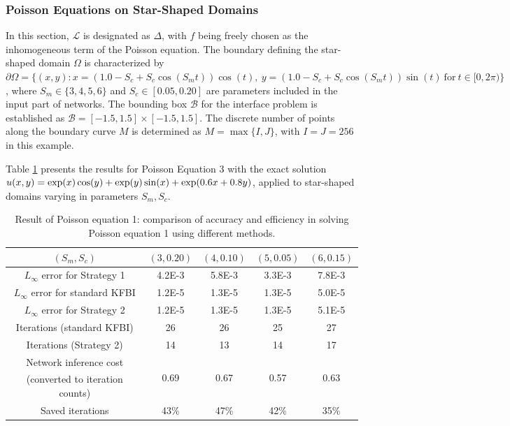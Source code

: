 \documentclass{article}
\begin{document}
\subsubsection{Poisson Equations on Star-Shaped Domains} \label{Poisson Equations on Star-Shaped Domains}
In this section, $\mathcal{L}$ is designated as $\Delta$, with $f$ being freely chosen as the inhomogeneous term of the Poisson equation. The boundary defining the star-shaped domain $\Omega$ is characterized by $\partial \Omega = \{(x, y): x = (1.0 - S_c + S_c \cos(S_m t)) \cos(t),\ y = (1.0 - S_c + S_c \cos(S_m t)) \sin(t)\ \mbox{for}\ t \in [0, 2\pi) \}$, where $S_m \in \{3, 4, 5, 6\}$ and $S_c \in [0.05, 0.20]$ are parameters included in the input part of networks. The bounding box $\mathcal{B}$ for the interface problem is established as $\mathcal{B} = [-1.5,1.5] \times [-1.5,1.5]$. The discrete number of points along the boundary curve $M$ is determined as $M = \max\{I, J\}$, with $I = J = 256$ in this example.

Table \ref{label2_4} presents the results for Poisson Equation 3 with the exact solution $u(x, y) = \exp(x) \\ \cos(y) + \exp(y) \sin(x) + \exp(0.6 x + 0.8 y)$, applied to star-shaped domains varying in parameters $S_m, S_c$.

\begin{table}[ht]
    \centering
    \begin{tabular}{|c|c|c|c|c|} \hline 
         $(S_m, S_c) $ & $(3, 0.20)$& $(4, 0.10) $& $(5, 0.05)$& $(6, 0.15) $\\ \hline 
         $L_{\infty}$ error for Strategy 1 & 4.2E-3 & 5.8E-3 & 3.3E-3 & 7.8E-3 \\ \hline
         $L_{\infty}$ error for standard KFBI & 1.2E-5 & 1.3E-5 & 1.3E-5 & 5.0E-5 \\ \hline
         $L_{\infty}$ error for Strategy 2 & 1.2E-5 & 1.3E-5 & 1.3E-5 & 5.1E-5 \\ \hline
         Iterations (standard KFBI) &  26&  26&25& 27\\ \hline 
         Iterations (Strategy 2) & 14&  13&14&17\\  \hline 
         
         Network inference cost
         & \multirow{2}{*}{0.69\bigstrut}
         & \multirow{2}{*}{0.67\bigstrut}
         & \multirow{2}{*}{0.57\bigstrut}
         & \multirow{2}{*}{0.63\bigstrut} \\
         (converted to iteration counts) & & & & \\ \hline
          
         Saved iterations & 43\%& 47\%& 42\%&35\%\\ \hline
    \end{tabular}
    \caption{Result of Poisson equation 1: comparison of accuracy and efficiency in solving Poisson equation 1 using different methods.}
    \label{label2_4}
\end{table}
\end{document}
